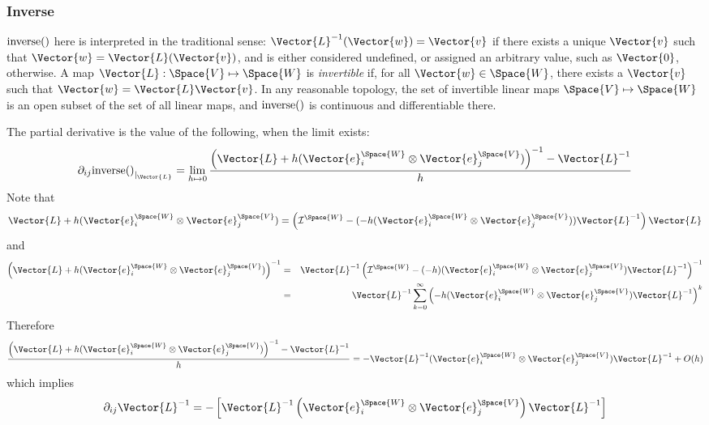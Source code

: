 
\subsubsection{Inverse}
\label{sec:Derivative-of-inverse}

$\mathrm{inverse}()$ here is interpreted in the traditional sense:
$\Vector{L}^{-1}(\Vector{w}) = \Vector{v}$ if there exists a unique $\Vector{v}$ such that $\Vector{w} = \Vector{L}(\Vector{v})$,
and is either considered undefined, or assigned an arbitrary
value, such as $\Vector{0}$, otherwise.
A map $\Vector{L} : \Space{V} \mapsto \Space{W}$ is {\it invertible}
if, for all $\Vector{w} \in \Space{W}$, there exists a $\Vector{v}$ such that
$\Vector{w} = \Vector{L} \Vector{v}$.
In any reasonable topology,
the set of invertible linear maps $\Space{V} \mapsto \Space{W}$
is an open subset of the set of all linear maps,
and $\mathrm{inverse}()$ is continuous and differentiable there.

The partial derivative is the value of the following, when the limit exists:
\begin{displaymath}
\db{ij}{\Inverse()}{\Vector{L}}
 =
\lim_{ h \mapsto 0}
\frac{ \left( \Vector{L} + h (\Vector{e}_i^{\Space{W}} \otimes \Vector{e}_j^{\Space{V}}) \right)^{-1} - \Vector{L}^{-1} }{h}
\end{displaymath}
Note that
\begin{displaymath}
\Vector{L} + h (\Vector{e}_i^{\Space{W}} \otimes \Vector{e}_j^{\Space{V}})
 =
\left( \Identity^{\Space{W}} - ( -h ( \Vector{e}_i^{\Space{W}} \otimes \Vector{e}_j^{\Space{V}} )) \Vector{L}^{-1} \right) \Vector{L}
\end{displaymath}
and
\begin{eqnarray*}
\left( \Vector{L} + h (\Vector{e}_i^{\Space{W}} \otimes \Vector{e}_j^{\Space{V}}) \right)^{-1}
& = &
\Vector{L}^{-1} \left( \Identity^{\Space{W}} - ( -h )( \Vector{e}_i^{\Space{W}} \otimes \Vector{e}_j^{\Space{V}} ) \Vector{L}^{-1} \right)^{-1}
\\
& = &
\Vector{L}^{-1} \sum_{k=0}^{\infty} \left( -h ( \Vector{e}_i^{\Space{W}} \otimes \Vector{e}_j^{\Space{V}} ) \Vector{L}^{-1} \right)^{k}
\nonumber
\end{eqnarray*}
Therefore
\begin{displaymath}
\frac{ \left( \Vector{L} + h (\Vector{e}_i^{\Space{W}} \otimes \Vector{e}_j^{\Space{V}}) \right)^{-1} - \Vector{L}^{-1} }{h}
 =
- \Vector{L}^{-1} ( \Vector{e}_i^{\Space{W}} \otimes \Vector{e}_j^{\Space{V}} )  \Vector{L}^{-1} + O(h)
\end{displaymath}
which implies
\begin{equation}
\da{ij}{\Vector{L}^{-1}}
 =
- \left[
\Vector{L}^{-1}
\left( \Vector{e}_i^{\Space{W}} \otimes \Vector{e}_j^{\Space{V}} \right)
\Vector{L}^{-1}
\right]
\end{equation}


